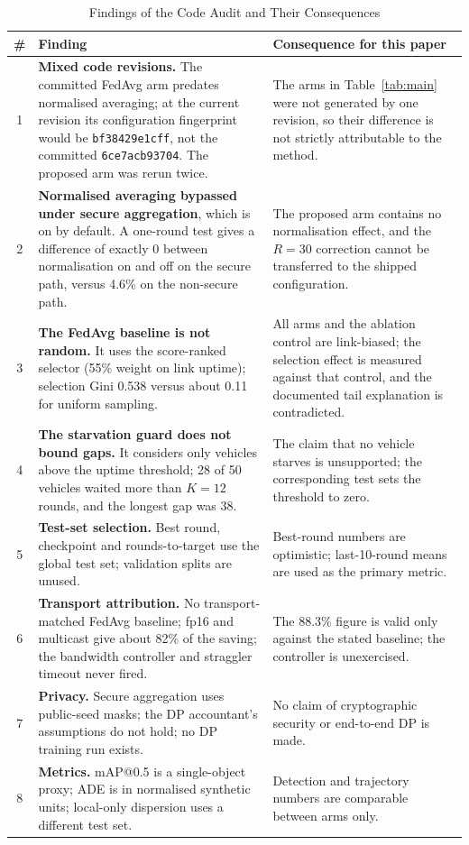 \documentclass[journal]{IEEEtran}
\newcommand{\code}[1]{\texttt{#1}}
\begin{document}
\begin{table}[!t]
\renewcommand{\arraystretch}{1.15}
\caption{Findings of the Code Audit and Their Consequences}
\label{tab:audit}
\centering
\footnotesize
\begin{tabular}{@{}c L{8.4cm} L{7.6cm}@{}}
\toprule
\# & Finding & Consequence for this paper\\
 & \textbf{Mixed code revisions.} The committed FedAvg arm predates normalised averaging; at the current revision its configuration fingerprint would be \code{bf38429e1cff}, not the committed \code{6ce7acb93704}. The proposed arm was rerun twice. & The arms in Table~\ref{tab:main} were not generated by one revision, so their difference is not strictly attributable to the method.\\
2 & \textbf{Normalised averaging bypassed under secure aggregation}, which is on by default. A one-round test gives a difference of exactly 0 between normalisation on and off on the secure path, versus 4.6\% on the non-secure path. & The proposed arm contains no normalisation effect, and the $R=30$ correction cannot be transferred to the shipped configuration.\\
3 & \textbf{The FedAvg baseline is not random.} It uses the score-ranked selector (55\% weight on link uptime); selection Gini 0.538 versus about 0.11 for uniform sampling. & All arms and the ablation control are link-biased; the selection effect is measured against that control, and the documented tail explanation is contradicted.\\
4 & \textbf{The starvation guard does not bound gaps.} It considers only vehicles above the uptime threshold; 28 of 50 vehicles waited more than $K=12$ rounds, and the longest gap was 38. & The claim that no vehicle starves is unsupported; the corresponding test sets the threshold to zero.\\
5 & \textbf{Test-set selection.} Best round, checkpoint and rounds-to-target use the global test set; validation splits are unused. & Best-round numbers are optimistic; last-10-round means are used as the primary metric.\\
6 & \textbf{Transport attribution.} No transport-matched FedAvg baseline; fp16 and multicast give about 82\% of the saving; the bandwidth controller and straggler timeout never fired. & The 88.3\% figure is valid only against the stated baseline; the controller is unexercised.\\
7 & \textbf{Privacy.} Secure aggregation uses public-seed masks; the DP accountant's assumptions do not hold; no DP training run exists. & No claim of cryptographic security or end-to-end DP is made.\\
8 & \textbf{Metrics.} mAP@0.5 is a single-object proxy; ADE is in normalised synthetic units; local-only dispersion uses a different test set. & Detection and trajectory numbers are comparable between arms only.\\
\bottomrule
\end{tabular}
\end{table}
\end{document}
